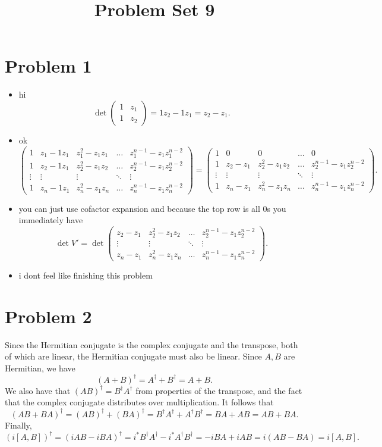 \documentclass[11pt, letterpaper]{article}
\title{Problem Set 9}
\begin{document}
\makeproblem
\section*{Problem 1}
\begin{itemize}
	\item hi
		\[
			\det \begin{pmatrix}
			1 & z_1 \\
			1 & z_2
			\end{pmatrix}=1z_2-1z_1=z_2-z_1
		.\]
	\item ok
		\[
			\begin{pmatrix}
			1 & z_1-1z_1 & z_1^2-z_1z_1 & \ldots  & z_1^{n-1} -z_1z_1^{n-2}  \\
			1 & z_2-1z_1 & z_2^2-z_1z_2 & \ldots  & z_2^{n-1}- z_1z_2^{n-2}  \\
			\vdots & \vdots & \vdots & \ddots &  \vdots\\
			1 & z_n-1z_1 & z_n^2-z_1z_n & \ldots  & z_n^{n-1} -z_1z_n^{n-2} 
			\end{pmatrix}=\begin{pmatrix}
			1 & 0 & 0 & \ldots  & 0  \\
			1 & z_2-z_1 & z_2^2-z_1z_2 & \ldots  & z_2^{n-1}- z_1z_2^{n-2}  \\
			\vdots & \vdots & \vdots & \ddots &  \vdots\\
			1 & z_n-z_1 & z_n^2-z_1z_n & \ldots  & z_n^{n-1} -z_1z_n^{n-2} 
			\end{pmatrix}
		.\]
	\item you can just use cofactor expansion and because the top row is all 0s you immediately have
		\[
			\det V'=\det \begin{pmatrix}
			z_2-z_1 & z_2^2-z_1z_2 & \ldots  & z_2^{n-1} -z_1z_2^{n-2}  \\
			\vdots & \vdots & \ddots & \vdots \\
			z_n-z_1 & z_n^2-z_1z_n & \ldots  & z_n^{n-1} -z_1z_n^{n-2} 
			\end{pmatrix}
		.\]
	\item i dont feel like finishing this problem
\end{itemize}

\section*{Problem 2}
Since the Hermitian conjugate is the complex conjugate and the transpose, both of which are linear, the Hermitian conjugate must also be linear. Since $A,B$ are Hermitian, we have
\[
	\left( A+B \right) ^{\dagger} =A^{\dagger} +B^{\dagger} =A+B
.\]
We also have that $(AB)^{\dagger} =B^{\dagger} A^{\dagger} $ from properties of the transpose, and the fact that the complex conjugate distributes over multiplication. It follows that
\[
	\left( AB+BA \right) ^{\dagger} =\left( AB \right) ^{\dagger} +\left( BA \right) ^{\dagger} =B^{\dagger} A^{\dagger} +A^{\dagger} B^{\dagger} =BA+AB=AB+BA
.\]
Finally,
\[
	\left( i\left[ A,B \right]  \right) ^{\dagger}=\left( iAB-iBA \right) ^{\dagger} =i^* B^{\dagger} A^{\dagger} -i^*A^{\dagger} B^{\dagger} =-iBA+iAB=i\left( AB-BA \right) =i\left[ A,B \right] 
.\]
\end{document}
